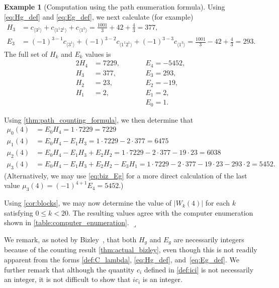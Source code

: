 \documentclass[11pt]{article}
\newcommand{\lrcornerqed}[0]{}
\renewcommand{\lrcornerqed}[0]{\hfill $\lrcorner$} %
\theoremstyle{definition} %
\newtheorem{example}[thm]{Example}
\numberwithin{equation}{section}
\begin{document}
\begin{example}[Computation using the path enumeration formula]
    Using \eqref{eq:Hg_def} and \eqref{eq:Eg_def}, we next calculate (for example)
    \begin{align}
    {H}_3 &= 
    c_{\langle 3^1 \rangle}
    + c_{\langle 1^1 2^1\rangle}
    +c_{\langle 1^3 \rangle}
    =\frac{1001}{3}+42+\frac43 = 377,\\
    {E}_3 &= 
    (-1)^{3-1}c_{\langle 3^1 \rangle}
    + (-1)^{3-2}c_{\langle 1^1 2^1\rangle}
    +(-1)^{3-3}c_{\langle 1^3 \rangle}
    =\frac{1001}{3}-42+\frac43 = 293.
    \end{align} 
    The full set of ${H}_k$ and ${E}_k$ values is
    \begin{alignat}{2}
        {H}_4 &= 7229,  \qquad &&{E}_4 = -5452,\\
        {H}_3 &= 377, \qquad &&{E}_3 = 293,\\
        {H}_2 &= 23, \qquad &&{E}_2 =-19, \\
        {H}_1 &= 2, \qquad &&{E}_1 = 2, \\
        & &&{E}_0 = 1.
    \end{alignat}
    
    Using \cref{thm:path_counting_formula}, we then determine that 
    \begin{align}
        \mu_0(4) &= 
        {E}_0 {H}_{4} =1 \cdot 7229= 7229\\
        \mu_1(4) &= 
        {E}_0 {H}_{4}-
        {E}_1 {H}_{3} = 1 \cdot 7229 - 2 \cdot 377 = 6475\\
        \mu_2(4) &= 
        {E}_0 {H}_{4}-
        {E}_1 {H}_{3}+ 
        {E}_2 {H}_{2} =  1 \cdot 7229 - 2 \cdot 377- 19 \cdot 23 =6038\\
        \mu_3(4) &= 
        {E}_0 {H}_{4}-
        {E}_1 {H}_{3}+ 
        {E}_2 {H}_{2}-
        {E}_3 {H}_{1}=  1 \cdot 7229 - 2 \cdot 377- 19 \cdot 23- 293 \cdot 2 =5452.
    \end{align}
    (Alternatively, we may use \eqref{eq:biz_Eg} for a more direct calculation of the last value $\mu_3(4) = (-1)^{4+1} {E}_4 = 5452$.)
    
    Using \cref{cor:blocks}, we may now determine the value of $|W_k(4)|$ for each $k$ satisfying $0 \le k <20$. The resulting values agree with the computer enumeration shown in \cref{table:computer_enumeration}. \lrcornerqed
\end{example}

We remark, as noted by Bizley~\cite{biz}, that both $H_g$ and $E_g$ are necessarily integers because of the counting result \cref{thm:actual_bizley}, even though this is not readily apparent from the forms \eqref{def:C_lambda}, \eqref{eq:Hg_def}, and~\eqref{eq:Eg_def}.
We further remark that although the quantity $c_i$ defined in \eqref{def:ici} is not necessarily an integer, it is not difficult to show that $ic_i$ is an integer. 
\end{document}
